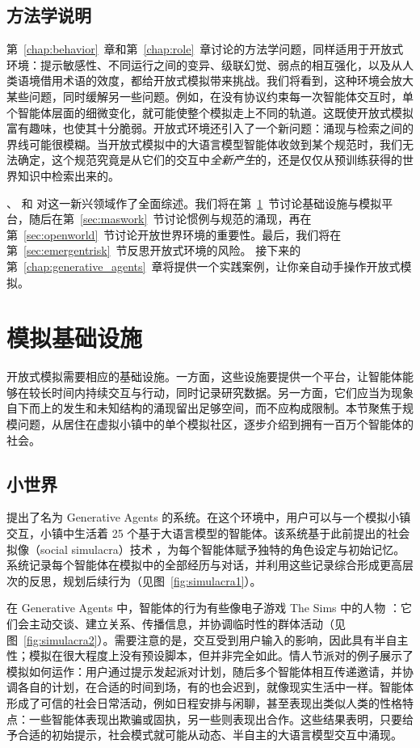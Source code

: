 \subsection{方法学说明}\label{sec:meth-emergent}
第~\ref{chap:behavior}~章和第~\ref{chap:role}~章讨论的方法学问题，同样适用于开放式环境：提示敏感性、不同运行之间的变异、级联幻觉、弱点的相互强化，以及从人类语境借用术语的效度，都给开放式模拟带来挑战。我们将看到，这种环境会放大某些问题，同时缓解另一些问题。例如，在没有协议约束每一次智能体交互时，单个智能体层面的细微变化，就可能使整个模拟走上不同的轨道。这既使开放式模拟富有趣味，也使其十分脆弱。开放式环境还引入了一个新问题：涌现与检索之间的界线可能很模糊。当开放式模拟中的大语言模型智能体收敛到某个规范时，我们无法确定，这个规范究竟是从它们的交互中\emph{全新产生}的，还是仅仅从预训练获得的世界知识中检索出来的。

\citet{mou2024individual}、\citet{savarimuthu2024harnessing} 和 \citet{xi2023rise} 对这一新兴领域作了全面综述。我们将在第~\ref{sec:emergentinfra}~节讨论基础设施与模拟平台，随后在第~\ref{sec:maswork}~节讨论惯例与规范的涌现，再在第~\ref{sec:openworld}~节讨论开放世界环境的重要性。最后，我们将在第~\ref{sec:emergentrisk}~节反思开放式环境的风险。
接下来的第~\ref{chap:generative_agents}~章将提供一个实践案例，让你亲自动手操作开放式模拟。

\section{模拟基础设施}\label{sec:emergentinfra}
开放式模拟需要相应的基础设施。一方面，这些设施要提供一个平台，让智能体能够在较长时间内持续交互与行动，同时记录研究数据。另一方面，它们应当为现象自下而上的发生和未知结构的涌现留出足够空间，而不应构成限制。本节聚焦于规模问题，从居住在虚拟小镇中的单个模拟社区，逐步介绍到拥有一百万个智能体的社会。

\subsection{小世界}\label{sec:gen-agent}
\citet{park2023generative} 提出了名为 Generative Agents 的系统。在这个环境中，用户可以与一个模拟小镇交互，小镇中生活着 25 个基于大语言模型的智能体。该系统基于此前提出的社会拟像（social simulacra）技术 \citep{park2022social}，为每个智能体赋予独特的角色设定与初始记忆。系统记录每个智能体在模拟中的全部经历与对话，并利用这些记录综合形成更高层次的反思，规划后续行为（见图~\ref{fig:simulacra1}）。

在 Generative Agents 中，智能体的行为有些像电子游戏 The Sims 中的人物 \citep{nutt2003sims}：它们会主动交谈、建立关系、传播信息，并协调临时性的群体活动（见图~\ref{fig:simulacra2}）。需要注意的是，交互受到用户输入的影响，因此具有半自主性；模拟在很大程度上没有预设脚本，但并非完全如此。情人节派对的例子展示了模拟如何运作：用户通过提示发起派对计划，随后多个智能体相互传递邀请，并协调各自的计划，在合适的时间到场，有的也会迟到，就像现实生活中一样。智能体形成了可信的社会日常活动，例如日程安排与闲聊，甚至表现出类似人类的性格特点：一些智能体表现出欺骗或固执，另一些则表现出合作。这些结果表明，只要给予合适的初始提示，社会模式就可能从动态、半自主的大语言模型交互中涌现。

